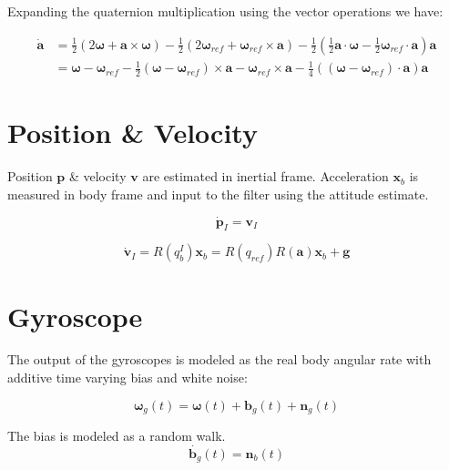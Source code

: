 \documentclass[a4paper]{paper}
\begin{document}
Expanding the quaternion multiplication using the vector operations we have:

\begin{equation}
    \begin{split}
    \dot{\bm{a}} &=
        \frac{1}{2} (2 \bm{\omega} + \bm{a} \times \bm{\omega})
        - \frac{1}{2} (2 \bm{\omega}_{ref} + \bm{\omega}_{ref} \times \bm{a})
        - \frac{1}{2} \left(
            \frac{1}{2} \bm{a} \cdot \bm{\omega}
            - \frac{1}{2} \bm{\omega}_{ref} \cdot \bm{a}
        \right) \bm{a} \\
    &= \bm{\omega} - \bm{\omega}_{ref}
        - \frac{1}{2} (\bm{\omega} - \bm{\omega}_{ref}) \times \bm{a}
        - \bm{\omega}_{ref} \times \bm{a}
        - \frac{1}{4} ((\bm{\omega} - \bm{\omega}_{ref}) \cdot \bm{a}) \bm{a}
\end{split}
\label{eq:adot}
\end{equation}



\section{Position \& Velocity}

Position $\bm{p}$ \& velocity $\bm{v}$ are estimated in inertial frame. Acceleration $\bm{x}_b$ is measured in body frame and input to the filter using the attitude estimate.

\begin{equation}
    \dot{\bm{p}}_I = \bm{v}_I
\end{equation}

\begin{equation}
    \dot{\bm{v}}_I = R(q_b^I) \bm{x}_b = R(q_{ref}) R(\bm{a}) \bm{x}_b + \bm{g}
\end{equation}



\section{Gyroscope}

The output of the gyroscopes is modeled as the real body angular rate with additive time varying bias and white noise:

\begin{equation}
    \bm{\omega}_g(t) = \bm{\omega}(t) + \bm{b}_g(t) + \bm{n}_g(t)
\end{equation}

The bias is modeled as a random walk.
\begin{equation}
    \dot{\bm{b}_g}(t) = \bm{n}_b(t)
\end{equation}
\end{document}
